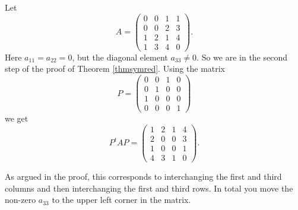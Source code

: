 \documentclass{article}
\begin{document}
\begin{example}\label{eksempel2}
  Let
  \begin{equation*}
    A =
    \begin{pmatrix}
      0 & 0 & 1 & 1\\
      0 & 0 & 2 & 3\\
      1 & 2 & 1 & 4\\
      1 & 3 & 4 & 0
    \end{pmatrix}.
  \end{equation*}
  Here $a_{11} = a_{22} = 0$, but the diagonal element $a_{33}\neq
  0$. So we are in the second step of the proof of
  Theorem \ref{thmsymred}.  Using the matrix
  \begin{equation*}
    P =
    \begin{pmatrix}
      0 & 0 & 1 & 0\\
      0 & 1 & 0 & 0\\
      1 & 0 & 0 & 0\\
      0 & 0 & 0 & 1
    \end{pmatrix}
  \end{equation*}
  we get
\begin{equation*}
  P^t A P =
    \begin{pmatrix}
      1 & 2 & 1 & 4\\
      2 & 0 & 0 & 3\\
      1 & 0 & 0 & 1\\
      4 & 3 & 1 & 0
    \end{pmatrix}
    .
  \end{equation*}


  As argued in the proof, this corresponds to interchanging the first
  and third columns and then interchanging the first and third
  rows. In total you move the non-zero $a_{33}$ to the upper left
  corner in the matrix.
\end{example}
\end{document}
